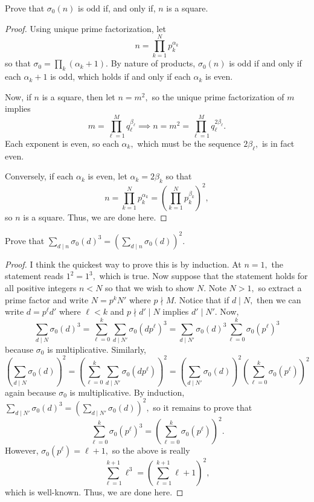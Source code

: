 \begin{exercise}
Prove that $\sigma_0(n)$ is odd if, and only if, $n$ is a square.
\end{exercise}

\begin{proof}
Using unique prime factorization, let
\[n=\prod_{k=1}^Np_k^{\alpha_k}\]
so that $\sigma_0=\prod_k(\alpha_k+1).$ By nature of products, $\sigma_0(n)$ is odd if and only if each $\alpha_k+1$ is odd, which holds if and only if each $\alpha_k$ is even.

Now, if $n$ is a square, then let $n=m^2,$ so the unique prime factorization of $m$ implies
\[m=\prod_{\ell=1}^Mq_\ell^{\beta_\ell}\implies n=m^2=\prod_{\ell=1}^Mq_\ell^{2\beta_\ell}.\]
Each exponent is even, so each $\alpha_k,$ which must be the sequence $2\beta_\ell,$ is in fact even.

Conversely, if each $\alpha_k$ is even, let $\alpha_k=2\beta_k$ so that
\[n=\prod_{k=1}^Np_k^{\alpha_k}=\left(\prod_{k=1}^Np_k^{\beta_k}\right)^2,\]
so $n$ is a square. Thus, we are done here.
\end{proof}

\begin{exercise}
Prove that $\sum_{d\mid n}\sigma_0(d)^3=\left(\sum_{d\mid n}\sigma_0(d)\right)^2.$
\end{exercise}

\begin{proof}
I think the quickest way to prove this is by induction. At $n=1,$ the statement reads $1^2=1^3,$ which is true. Now suppose that the statement holds for all positive integers $n<N$ so that we wish to show $N.$ Note $N>1,$ so extract a prime factor and write $N=p^kN'$ where $p\nmid M.$ Notice that if $d\mid N,$ then we can write $d=p^\ell d'$ where $\ell<k$ and $p\nmid d'\mid N$ implies $d'\mid N'.$ Now,
\[\sum_{d\mid N}\sigma_0(d)^3=\sum_{\ell=0}^k\sum_{d\mid N'}\sigma_0\left(dp^\ell\right)^3=\sum_{d\mid N'}\sigma_0(d)^3\sum_{\ell=0}^k\sigma_0\left(p^\ell\right)^3\]
because $\sigma_0$ is multiplicative. Similarly,
\[\left(\sum_{d\mid N}\sigma_0(d)\right)^2=\left(\sum_{\ell=0}^k\sum_{d\mid N'}\sigma_0\left(dp^\ell\right)\right)^2=\left(\sum_{d\mid N'}\sigma_0(d)\right)^2\left(\sum_{\ell=0}^k\sigma_0\left(p^\ell\right)\right)^2\]
again because $\sigma_0$ is multiplicative. By induction, $\sum_{d\mid N'}\sigma_0(d)^3=\left(\sum_{d\mid N'}\sigma_0(d)\right)^2,$ so it remains to prove that
\[\sum_{\ell=0}^k\sigma_0\left(p^\ell\right)^3=\left(\sum_{\ell=0}^k\sigma_0\left(p^\ell\right)\right)^2.\]
However, $\sigma_0\left(p^\ell\right)=\ell+1,$ so the above is really
\[\sum_{\ell=1}^{k+1}\ell^3=\left(\sum_{\ell=1}^{k+1}\ell+1\right)^2,\]
which is well-known. Thus, we are done here.
\end{proof}

